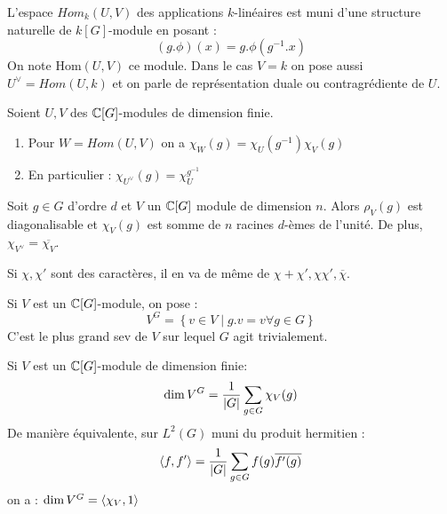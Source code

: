 \documentclass{cours}
\begin{document}
\begin{definition}
    L'espace $Hom_{k}(U, V)$ des applications $k$-linéaires est muni d'une structure naturelle de $k[G]$-module en posant :
    \[
        \left(g.\phi\right)(x) = g.\phi(g^{-1}.x)
    \]
    On note Hom$(U, V)$ ce module. Dans le cas $V = k$ on pose aussi $U^{\lor} = Hom(U, k)$ et on parle de représentation duale ou contragrédiente de $U$.
\end{definition}

\begin{proposition}
    Soient $U, V$ des $\mathbb{C}[G]$-modules de dimension finie.
    \begin{enumerate}
        \item Pour $W = Hom(U, V)$ on a $\chi_{W}(g) = \chi_{U}(g^{-1})\chi_{V}(g)$
        \item En particulier : $\chi_{U^{\lor}}(g) = \chi_{U}^{g^{-1}}$
    \end{enumerate}
\end{proposition}
\begin{proposition}
    Soit $g \in G$ d'ordre $d$ et $V$ un $\mathbb{C}[G]$ module de dimension $n$. Alors $\rho_{V}(g)$ est diagonalisable et $\chi_{V}(g)$ est somme de $n$ racines $d$-èmes de l'unité. De plus, $\chi_{V^{\lor}} = \overline{\chi_{V}}$.
\end{proposition}

\begin{corollary}
    Si $\chi, \chi'$ sont des caractères, il en va de même de $\chi + \chi', \chi\chi', \overline{\chi}$.
\end{corollary}

\begin{definition}
    Si $V$ est un $\mathbb{C}[G]$-module, on pose :
    \[
        V^{G} = \left\{v\in V \mid g.v = v \forall g \in G\right\}
    \]
    C'est le plus grand sev de $V$ sur lequel $G$ agit trivialement.
\end{definition}

\begin{lemma}
    Si $V$ est un $\mathbb{C}[G]$-module de dimension finie:
    \[
        \dim V^{G} = \frac{1}{\left|G\right|} \sum_{g \in G}\chi_{V}(g)
    \]
    De manière équivalente, sur $L^{2}(G)$ muni du produit hermitien :
    \[
        \left\langle f, f' \right\rangle = \frac{1}{\left|G\right|}\sum_{g \in G}f(g)\overline{f'(g)}
    \]
    on a : $\dim V^{G} = \left\langle \chi_{V}, 1 \right\rangle$
\end{lemma}
\end{document}
